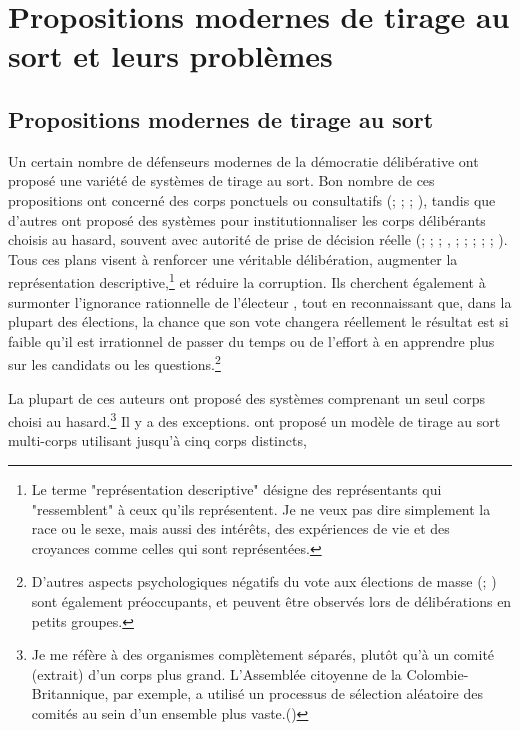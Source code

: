 \section{Propositions modernes de tirage au sort et leurs problèmes}  
\subsection{Propositions modernes de tirage au sort}
Un certain nombre de défenseurs modernes de la démocratie
délibérative ont proposé une variété de systèmes de tirage au
sort. Bon nombre de ces propositions ont concerné des corps
ponctuels ou consultatifs (\autocite{dien95}; \autocite{dahl89};
\autocite{crosby86}; \autocite{fishkin09}), tandis que d'autres ont
proposé des systèmes pour institutionnaliser les corps délibérants
choisis au hasard, souvent avec autorité de prise de décision réelle
(\autocite{burn85}; \autocite{call85}; \autocite{gast00};
\autocite{cars99}, \autocite{cars05}; \autocite{goll07};
\autocite{leib04}; \autocite{oleary06}; \autocite{sutherland08};
\autocite{zak10}). Tous ces plans visent à renforcer 
une véritable délibération, augmenter la représentation
descriptive,\footnote{Le terme "représentation descriptive" désigne
  des représentants qui "ressemblent" à ceux qu'ils représentent. Je
  ne veux pas dire simplement la race ou le sexe, mais aussi des
  intérêts, des expériences de vie et des croyances comme celles qui
  sont représentées.} et réduire la corruption. Ils cherchent
également à surmonter l'ignorance rationnelle de l'électeur , tout en
reconnaissant que, dans la plupart des élections, la chance que son
vote changera réellement le résultat est si faible qu'il est
irrationnel de passer du temps ou de l'effort à en apprendre plus sur
les candidats ou les questions.\footnote{D'autres aspects
  psychologiques négatifs du vote aux élections de masse
  (\autocite{caplan07}; \autocite{westen07}) sont également préoccupants, et
  peuvent être observés lors de délibérations en petits groupes.}\par 
La plupart de ces auteurs ont proposé des systèmes comprenant un seul
corps choisi au hasard.\footnote{Je me réfère à des organismes
complètement séparés, plutôt qu'à un comité (extrait) d'un corps plus
grand. L'Assemblée citoyenne de la Colombie-Britannique, par exemple,
a utilisé un processus de sélection aléatoire des comités au sein
d'un ensemble plus vaste.(\autocite{herath07})} Il y a des
exceptions. \autocite{gast12} ont proposé un modèle de
tirage au sort multi-corps utilisant jusqu'à cinq corps distincts,
